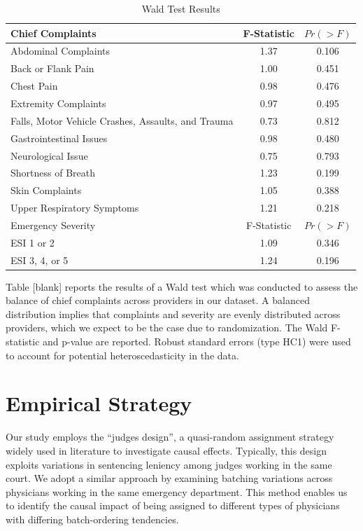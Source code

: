 \documentclass[,,nonblindrev]{informs}
\begin{document}
\begin{table}[htbp]
    \centering
    \caption{Wald Test Results}
    \begin{tabular}{lcc}
        \toprule
        Chief Complaints & F-Statistic & $Pr(> F)$ \\
        \midrule
        Abdominal Complaints & 1.37 & 0.106 \\
        Back or Flank Pain & 1.00 & 0.451 \\
        Chest Pain & 0.98 & 0.476 \\
        Extremity Complaints & 0.97 & 0.495 \\
        Falls, Motor Vehicle Crashes, Assaults, and Trauma & 0.73 & 0.812 \\
        Gastrointestinal Issues & 0.98 & 0.480 \\
        Neurological Issue & 0.75 & 0.793 \\
        Shortness of Breath & 1.23 & 0.199 \\
        Skin Complaints & 1.05 & 0.388 \\
        Upper Respiratory Symptoms & 1.21 & 0.218 \\
        \midrule
        Emergency Severity & F-Statistic & $Pr(> F)$ \\
        \midrule
        ESI 1 or 2 & 1.09 & 0.346 \\
        ESI 3, 4, or 5 & 1.24 & 0.196 \\
        \bottomrule
    \end{tabular}
\begin{tablenotes}
\tiny
\item Table [blank] reports the results of a Wald test which was conducted to assess the balance of chief complaints across providers in our dataset. A balanced distribution implies that complaints and severity are evenly distributed across providers, which we expect to be the case due to randomization. The Wald F-statistic and p-value are reported. Robust standard errors (type HC1) were used to account for potential heteroscedasticity in the data.
\end{tablenotes}
\end{table}

\hypertarget{sec:3}{%
\section{Empirical Strategy}\label{sec:3}}

Our study employs the ``judges design'', a quasi-random assignment
strategy widely used in literature to investigate causal effects.
Typically, this design exploits variations in sentencing leniency among
judges working in the same court. We adopt a similar approach by
examining batching variations across physicians working in the same
emergency department. This method enables us to identify the causal
impact of being assigned to different types of physicians with differing
batch-ordering tendencies.
\end{document}
